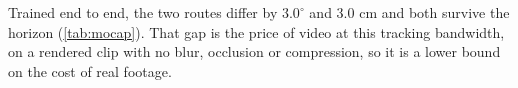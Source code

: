 \documentclass[letterpaper, 10 pt, conference]{ieeeconf}
\newcommand{\pmv}[2]{#1{\scriptstyle \pm #2}}
\begin{document}
Trained end to end, the two routes differ by $3.0^\circ$ and $3.0$ cm and both survive the horizon (\autoref{tab:mocap}). That gap is the price of video at this tracking bandwidth, on a rendered clip with no blur, occlusion or compression, so it is a lower bound on the cost of real footage.
\end{document}
